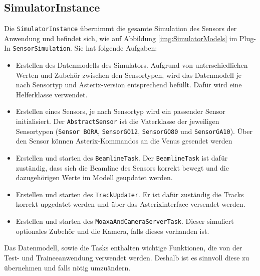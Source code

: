 \subsection{SimulatorInstance}

Die \texttt{SimulatorInstance} übernimmt die gesamte Simulation des Sensors der Anwendung und befindet sich, wie auf Abbildung \ref{img:SimulatorModels} im Plug-In \texttt{SensorSimulation}. Sie hat folgende Aufgaben:

\begin{itemize}
    \item Erstellen des Datenmodells des Simulators. Aufgrund von unterschiedlichen Werten und Zubehör zwischen den Sensortypen, wird das       Datenmodell je nach Sensortyp und Asterix-version entsprechend befüllt. Dafür wird eine Helferklasse verwendet.
    \item Erstellen eines Sensors, je nach Sensortyp wird ein passender Sensor initialisiert. 
        Der \texttt{AbstractSensor} ist die Vaterklasse der jeweiligen Sensortypen (\texttt{Sensor BORA}, \texttt{SensorGO12}, \texttt{SensorGO80} und \texttt{SensorGA10}). Über den Sensor können Asterix-Kommandos an die Venus gesendet werden
    
    \item Erstellen und starten des \texttt{BeamlineTask}. Der \texttt{BeamlineTask} ist dafür zuständig, dass sich die Beamline des Sensors korrekt bewegt und die dazugehörigen Werte im Modell geupdatet werden.
    \item Erstellen und starten des \texttt{TrackUpdater}. Er ist dafür zuständig die Tracks korrekt upgedatet werden und über das Asterixinterface versendet werden.
    \item Erstellen und starten des \texttt{MoaxaAndCameraServerTask}. Dieser simuliert optionales Zubehör und die Kamera, falls dieses vorhanden ist.    
    
\end{itemize}

Das Datenmodell, sowie die Tasks enthalten wichtige Funktionen, die von der Test- und Traineeanwendung verwendet werden. Deshalb ist es sinnvoll diese zu übernehmen und falls nötig umzuändern.
